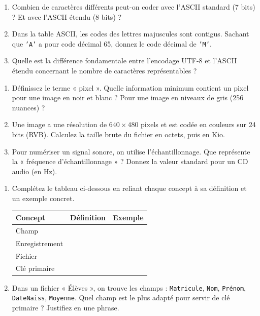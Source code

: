 \documentclass[11pt]{article}
\begin{document}
\begin{exercice}
\begin{enumerate}
    \item Combien de caractères différents peut-on coder avec l'ASCII standard (7 bits) ? Et avec l'ASCII étendu (8 bits) ?
    \item Dans la table ASCII, les codes des lettres majuscules sont contigus. Sachant que \texttt{'A'} a pour code décimal 65, donnez le code décimal de \texttt{'M'}.
    \item Quelle est la différence fondamentale entre l'encodage UTF-8 et l'ASCII étendu concernant le nombre de caractères représentables ?
\end{enumerate}
\end{exercice}

\begin{exercice}
\begin{enumerate}
    \item Définissez le terme « pixel ». Quelle information minimum contient un pixel pour une image en noir et blanc ? Pour une image en niveaux de gris (256 nuances) ?
    \item Une image a une résolution de $640 \times 480$ pixels et est codée en couleurs sur 24 bits (RVB). Calculez la taille brute du fichier en octets, puis en Kio.
    \item Pour numériser un signal sonore, on utilise l'échantillonnage. Que représente la « fréquence d'échantillonnage » ? Donnez la valeur standard pour un CD audio (en Hz).
\end{enumerate}
\end{exercice}

\begin{exercice}
\begin{enumerate}
    \item Complétez le tableau ci-dessous en reliant chaque concept à sa définition et un exemple concret.
    \begin{tabular}{|l|p{6cm}|p{4cm}|}
    \hline
    \textbf{Concept} & \textbf{Définition} & \textbf{Exemple} \\
    \hline
    Champ & & \\
    \hline
    Enregistrement & & \\
    \hline
    Fichier & & \\
    \hline
    Clé primaire & & \\
    \hline
    \end{tabular}
    \item Dans un fichier « Élèves », on trouve les champs : \texttt{Matricule}, \texttt{Nom}, \texttt{Prénom}, \texttt{DateNaiss}, \texttt{Moyenne}. Quel champ est le plus adapté pour servir de clé primaire ? Justifiez en une phrase.
\end{enumerate}
\end{exercice}
\end{document}
